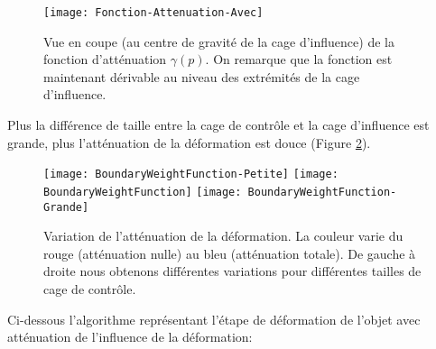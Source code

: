 \begin{figure}[ht]
\begin{center}
\texttt{[image: Fonction-Attenuation-Avec]}

\caption[Fonction d'atténuation $\gamma$(p)] {Vue en coupe (au centre de
gravité de la cage d'influence) de la fonction d'atténuation $\gamma(p)$. On
remarque que la fonction est maintenant dérivable au niveau des extrémités de
la cage d'influence.}

\label{MELAtL}

\end{center}
\end{figure}

Plus la différence de taille entre la cage de contrôle et la cage d'influence
est grande, plus l'atténuation de la déformation est douce (Figure
\ref{MELBou}).

\begin{figure}[ht]
  \begin{center}
    \texttt{[image: BoundaryWeightFunction-Petite]}
    \texttt{[image: BoundaryWeightFunction]}
    \texttt{[image: BoundaryWeightFunction-Grande]}

    \caption[Variation de l'atténuation de la déformation] {Variation de
l'atténuation de la déformation. La couleur varie du rouge (atténuation nulle)
au bleu (atténuation totale). De gauche à droite nous obtenons différentes
variations pour différentes tailles de cage de contrôle.}

    \label{MELBou}
  \end{center}
\end{figure}

Ci-dessous l'algorithme représentant l'étape de déformation de l'objet avec
atténuation de l'influence de la déformation: \\


